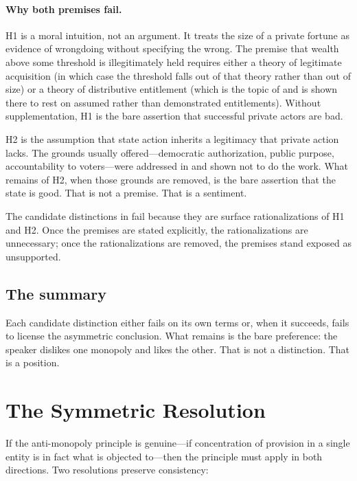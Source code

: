 \documentclass[11pt]{article}
\begin{document}
\paragraph{Why both premises fail.}
H1 is a moral intuition, not an argument. It treats the size of a private fortune as evidence of wrongdoing without specifying the wrong. The premise that wealth above some threshold is illegitimately held requires either a theory of legitimate acquisition (in which case the threshold falls out of that theory rather than out of size) or a theory of distributive entitlement (which is the topic of \cite{mckinley0A,mckinley0B} and is shown there to rest on assumed rather than demonstrated entitlements). Without supplementation, H1 is the bare assertion that successful private actors are bad.

H2 is the assumption that state action inherits a legitimacy that private action lacks. The grounds usually offered---democratic authorization, public purpose, accountability to voters---were addressed in  and shown not to do the work. What remains of H2, when those grounds are removed, is the bare assertion that the state is good. That is not a premise. That is a sentiment.

The candidate distinctions in  fail because they are surface rationalizations of H1 and H2. Once the premises are stated explicitly, the rationalizations are unnecessary; once the rationalizations are removed, the premises stand exposed as unsupported.

\subsection{The summary}

Each candidate distinction either fails on its own terms or, when it succeeds, fails to license the asymmetric conclusion. What remains is the bare preference: the speaker dislikes one monopoly and likes the other. That is not a distinction. That is a position.

\section{The Symmetric Resolution}

If the anti-monopoly principle is genuine---if concentration of provision in a single entity is in fact what is objected to---then the principle must apply in both directions. Two resolutions preserve consistency:
\end{document}
